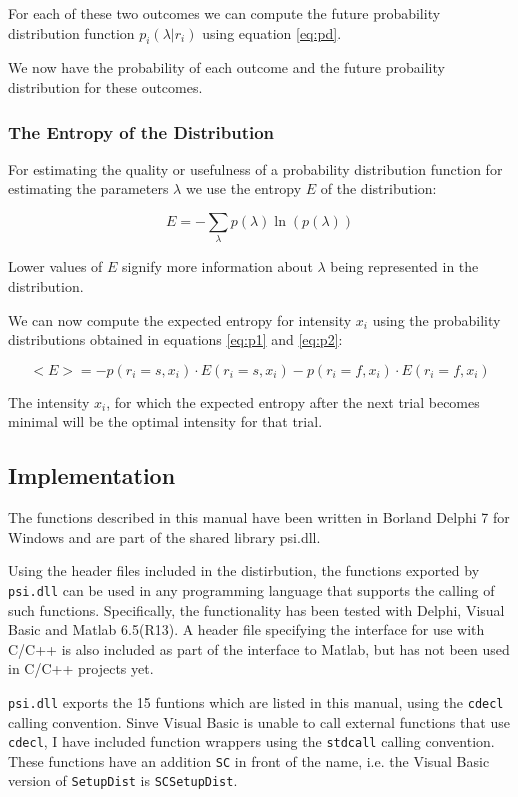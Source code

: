 \documentclass[10pt,letterpaper]{article}
\begin{document}
For each of these two outcomes we can compute the future probability 
distribution function $p_i(\lambda|r_i)$ using equation \ref{eq:pd}.

We now have the probability of each outcome and the future probaility 
distribution for these outcomes.

\subsubsection{The Entropy of the Distribution}

For estimating the quality or usefulness of a probability distribution function for
estimating the parameters $\lambda$ we use the entropy $E$ of the distribution:

\begin{equation}
E = - \sum_\lambda p(\lambda) \ln ( p(\lambda) )
\end{equation}

Lower values of $E$ signify more information about $\lambda$ being represented in the
distribution.

We can now compute the expected entropy for intensity $x_i$ using the probability distributions
obtained in equations \ref{eq:p1} and \ref{eq:p2}:

\begin{equation}
<E> = - p(r_i=s,x_i) \cdot E(r_i=s,x_i) - p(r_i=f,x_i) \cdot E(r_i=f,x_i)
\end{equation}

The intensity $x_i$, for which the expected entropy after the next trial becomes 
minimal will be the optimal intensity for that trial.

\subsection{Implementation}

The functions described in this manual have been written in Borland Delphi 7 for 
Windows and are part of the shared library psi.dll.

Using the header files included in the distirbution, the functions exported by 
{\tt psi.dll} can be used in any programming language that supports the calling 
of such functions. Specifically, the functionality has been tested with Delphi, 
Visual Basic and Matlab 6.5(R13). A header file specifying the interface for use 
with C/C++ is also included as part of the interface to Matlab, but has not been
used in C/C++ projects yet.

{\tt psi.dll} exports the 15 funtions which are listed in this manual, using the 
{\tt cdecl} calling convention. Sinve Visual Basic is unable to call external 
functions that use {\tt cdecl}, I have included function wrappers using the 
{\tt stdcall} calling convention. These functions have an addition {\tt SC} in front
of the name, i.e. the Visual Basic version of {\tt SetupDist} is {\tt SCSetupDist}.
\end{document}
